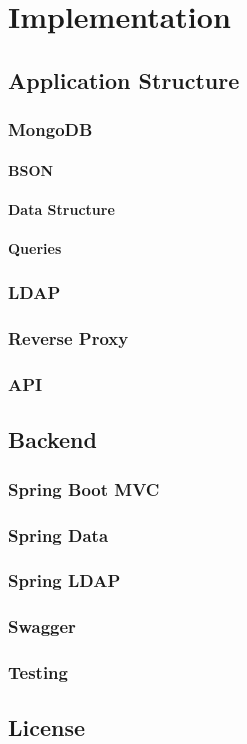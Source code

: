 \chapter{Implementation}

\section{Application Structure}
\subsection{MongoDB}
\subsubsection{BSON}
\subsubsection{Data Structure}
\subsubsection{Queries}
\subsection{LDAP}
\subsection{Reverse Proxy}
\subsection{API}

\section{Backend}
\subsection{Spring Boot MVC}
\subsection{Spring Data}
\subsection{Spring LDAP}
\subsection{Swagger}
\subsection{Testing}

\section{License}
